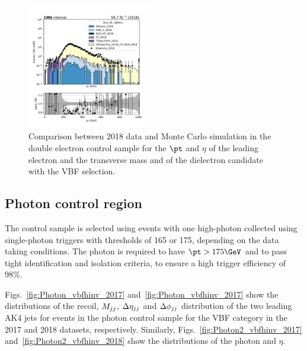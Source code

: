 \begin{figure}[htbp]
\begin{center}
        \includegraphics[width=0.49\textwidth]{fig/datamc/cr_2e_vbf/cr_2e_vbf_dielectron_pt_losf_2018.pdf}
    \end{center}
    \caption{Comparison between 2018 data and Monte Carlo simulation in the double electron control sample for
        the $\pt$ and $\eta$ of the leading electron and the transverse mass and \pt of the dielectron candidate with the VBF selection.}
    \label{fig:DE2_vbfhinv_2018}
\end{figure}

\newpage

\subsection{Photon control region}
\label{sec:selection_cr_g}

The \phojets control sample is selected using events with one high-\pt photon collected using single-photon triggers 
with \pt thresholds of 165 or 175\GeV, depending on the data taking conditions. 
The photon is required to have $\pt > 175\GeV$ and to pass tight identification and isolation criteria, 
to ensure a high trigger efficiency of 98\%. 

Figs.~\ref{fig:Photon_vbfhinv_2017} and~\ref{fig:Photon_vbfhinv_2017} show the distributions of the recoil, $M_{jj}$, $\Delta \eta_{jj}$ and 
$\Delta \phi_{jj}$ distribution of the two leading AK4 jets for events in the photon control sample for the VBF category in the 
2017 and 2018 datasets, respectively. 
Similarly, Figs.~\ref{fig:Photon2_vbfhinv_2017} and~\ref{fig:Photon2_vbfhinv_2018} show the distributions of the photon \pt and $\eta$.

